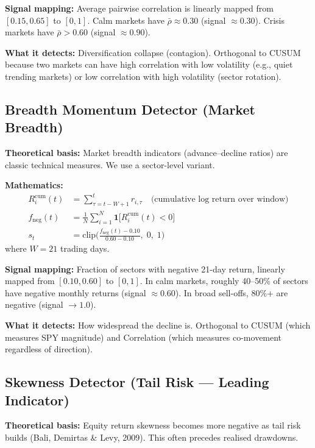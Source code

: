 \documentclass[11pt,a4paper]{article}
\begin{document}
\textbf{Signal mapping:} Average pairwise correlation is linearly mapped from $[0.15, 0.65]$ to $[0, 1]$. Calm markets have $\bar{\rho} \approx 0.30$ (signal $\approx 0.30$). Crisis markets have $\bar{\rho} > 0.60$ (signal $\approx 0.90$).

\textbf{What it detects:} Diversification collapse (contagion). Orthogonal to CUSUM because two markets can have high correlation with low volatility (e.g., quiet trending markets) or low correlation with high volatility (sector rotation).

\subsection{Breadth Momentum Detector (Market Breadth)}

\textbf{Theoretical basis:} Market breadth indicators (advance--decline ratios) are classic technical measures. We use a sector-level variant.

\textbf{Mathematics:}
\begin{align}
  R_i^{\mathrm{cum}}(t) &= \sum_{\tau=t-W+1}^{t} r_{i,\tau} \quad \text{(cumulative log return over window)} \\
  f_{\mathrm{neg}}(t) &= \frac{1}{N}\sum_{i=1}^{N} \mathbf{1}\big[R_i^{\mathrm{cum}}(t) < 0\big] \\
  s_t &= \mathrm{clip}\!\bigg(\frac{f_{\mathrm{neg}}(t) - 0.10}{0.60 - 0.10},\; 0,\; 1\bigg) \label{eq:breadth-signal}
\end{align}
where $W = 21$ trading days.

\textbf{Signal mapping:} Fraction of sectors with negative 21-day return, linearly mapped from $[0.10, 0.60]$ to $[0, 1]$. In calm markets, roughly 40--50\% of sectors have negative monthly returns (signal $\approx 0.60$). In broad sell-offs, 80\%+ are negative (signal $\to 1.0$).

\textbf{What it detects:} How widespread the decline is. Orthogonal to CUSUM (which measures SPY magnitude) and Correlation (which measures co-movement regardless of direction).

\subsection{Skewness Detector (Tail Risk --- Leading Indicator)}

\textbf{Theoretical basis:} Equity return skewness becomes more negative as tail risk builds (Bali, Demirtas \& Levy, 2009). This often precedes realised drawdowns.
\end{document}
